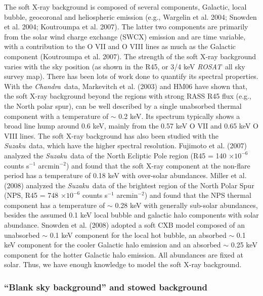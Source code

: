\documentclass{aastex}
\def\suzaku       {{\em Suzaku}\/}
\def\chandra    {{\em Chandra}\/}
\def\rosat      {{\em ROSAT}\/}
\begin{document}
\begin{appendix}
The soft X-ray background is composed of several components, Galactic, local bubble,
geocoronal and heliospheric emission (e.g., Wargelin et al. 2004; Snowden et al. 2004;
Koutroumpa et al. 2007). The latter two components are primarily from the solar wind
charge exchange (SWCX) emission and are time variable, with a contribution to
the O VII and O VIII lines as much as the Galactic component (Koutroumpa et al. 2007).
The strength of the soft X-ray background varies
with the sky position (as shown in the R45, or 3/4 keV \rosat\ all sky survey map).
There has been lots of work done to quantify its spectral properties. With the
\chandra\ data, Markevitch et al. (2003) and HM06 have shown that, the soft
X-ray background beyond the regions with strong RASS R45 flux (e.g., the
North polar spur), can be well described by a single unabsorbed thermal component with
a temperature of $\sim$ 0.2 keV. Its spectrum typically shows a broad line hump
around 0.6 keV, mainly from the 0.57 keV O VII and 0.65 keV O VIII lines.
The soft X-ray background has also been studied with the \suzaku\ data, which
have the higher spectral resolution.
Fujimoto et al. (2007) analyzed the \suzaku\ data of the North Ecliptic Pole
region (R45 = 140 $\times10^{-6}$ counts s$^{-1}$ arcmin$^{-2}$) and found
that the soft X-ray component at the non-flare period has a temperature of 0.18 keV
with over-solar abundances.
Miller et al. (2008) analyzed the \suzaku\ data of the brightest
region of the North Polar Spur (NPS, R45 = 748 $\times10^{-6}$ counts s$^{-1}$
arcmin$^{-2}$) and found that the NPS thermal component has a temperature of
$\sim$ 0.28 keV with generally sub-solar abundances, besides the assumed 0.1 keV
local bubble and galactic halo components with solar abundance. Snowden et al. (2008)
adopted a soft CXB model composed of an unabsorbed $\sim$ 0.1 keV component for
the local hot bubble, an absorbed $\sim$ 0.1 keV component for the cooler Galactic
halo emission and an absorbed $\sim$ 0.25 keV component for the hotter Galactic
halo emission. All abundances are fixed at solar.
Thus, we have enough knowledge to model the soft X-ray background.

\subsubsection{``Blank sky background'' and stowed background}


\end{appendix}
\end{document}

